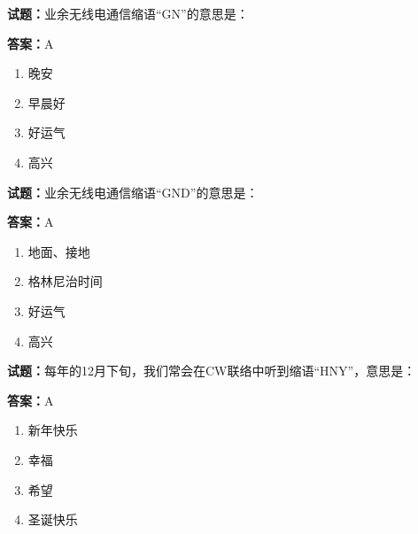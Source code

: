 \documentclass{ctexbook}
\begin{document}




\vspace{1em}

\textbf{试题：}业余无线电通信缩语“GN”的意思是： 

\textbf{答案：}A 

\begin{enumerate}[leftmargin=3em]
  \item 晚安 

  \item 早晨好 

  \item 好运气 

  \item 高兴 

\end{enumerate}





\vspace{1em}

\textbf{试题：}业余无线电通信缩语“GND”的意思是： 

\textbf{答案：}A 

\begin{enumerate}[leftmargin=3em]
  \item 地面、接地 

  \item 格林尼治时间 

  \item 好运气 

  \item 高兴 

\end{enumerate}





\vspace{1em}

\textbf{试题：}每年的12月下旬，我们常会在CW联络中听到缩语“HNY”，意思是： 

\textbf{答案：}A 

\begin{enumerate}[leftmargin=3em]
  \item 新年快乐 

  \item 幸福 

  \item 希望 

  \item 圣诞快乐 

\end{enumerate}
\end{document}
